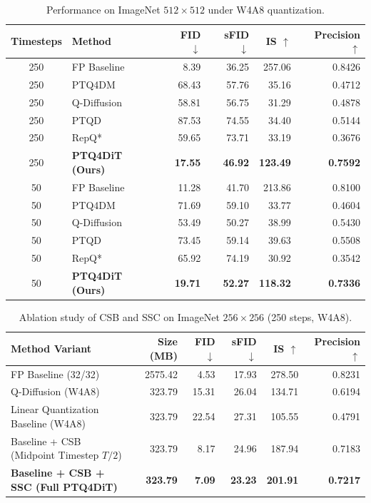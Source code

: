 \documentclass[10pt,a4paper]{article}
\begin{document}
\begin{table}[htbp]
\centering
\caption{Performance on ImageNet $512 \times 512$ under W4A8 quantization.}
\label{tab:imagenet512}
\begin{tabularx}{\textwidth}{@{}c X r r r r@{}}
\toprule
\textbf{Timesteps} & \textbf{Method} & \textbf{FID $\downarrow$} & \textbf{sFID $\downarrow$} & \textbf{IS $\uparrow$} & \textbf{Precision $\uparrow$} \\
\midrule
250 & FP Baseline & 8.39 & 36.25 & 257.06 & 0.8426 \\
250 & PTQ4DM & 68.43 & 57.76 & 35.16 & 0.4712 \\
250 & Q-Diffusion & 58.81 & 56.75 & 31.29 & 0.4878 \\
250 & PTQD & 87.53 & 74.55 & 34.40 & 0.5144 \\
250 & RepQ* & 59.65 & 73.71 & 33.19 & 0.3676 \\
250 & \textbf{PTQ4DiT (Ours)} & \textbf{17.55} & \textbf{46.92} & \textbf{123.49} & \textbf{0.7592} \\
\midrule
50 & FP Baseline & 11.28 & 41.70 & 213.86 & 0.8100 \\
50 & PTQ4DM & 71.69 & 59.10 & 33.77 & 0.4604 \\
50 & Q-Diffusion & 53.49 & 50.27 & 38.99 & 0.5430 \\
50 & PTQD & 73.45 & 59.14 & 39.63 & 0.5508 \\
50 & RepQ* & 65.92 & 74.19 & 30.92 & 0.3542 \\
50 & \textbf{PTQ4DiT (Ours)} & \textbf{19.71} & \textbf{52.27} & \textbf{118.32} & \textbf{0.7336} \\
\bottomrule
\end{tabularx}
\end{table}

\begin{table}[htbp]
\centering
\caption{Ablation study of CSB and SSC on ImageNet $256 \times 256$ (250 steps, W4A8).}
\label{tab:ablation}
\begin{tabularx}{\textwidth}{@{}X r r r r r@{}}
\toprule
\textbf{Method Variant} & \textbf{Size (MB)} & \textbf{FID $\downarrow$} & \textbf{sFID $\downarrow$} & \textbf{IS $\uparrow$} & \textbf{Precision $\uparrow$} \\
\midrule
FP Baseline (32/32) & 2575.42 & 4.53 & 17.93 & 278.50 & 0.8231 \\
Q-Diffusion (W4A8) & 323.79 & 15.31 & 26.04 & 134.71 & 0.6194 \\
Linear Quantization Baseline (W4A8) & 323.79 & 22.54 & 27.31 & 105.55 & 0.4791 \\
Baseline + CSB (Midpoint Timestep $T/2$) & 323.79 & 8.17 & 24.96 & 187.94 & 0.7183 \\
\textbf{Baseline + CSB + SSC (Full PTQ4DiT)} & \textbf{323.79} & \textbf{7.09} & \textbf{23.23} & \textbf{201.91} & \textbf{0.7217} \\
\bottomrule
\end{tabularx}
\end{table}
\end{document}
